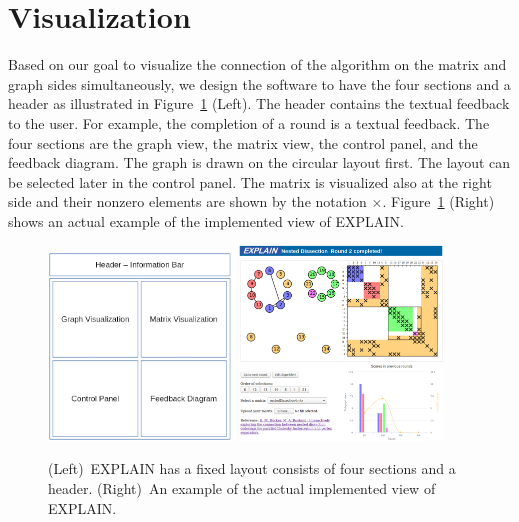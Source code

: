 \documentclass[12pt, twoside,a4paper,toc=bibliography]{scrbook}
\newcommand{\figref}[1]{Figure~\protect\ref{#1}}
\begin{document}
\section{Visualization}
\label{s.vis}
Based on our goal to visualize the connection of the algorithm on the matrix and graph sides simultaneously,
we design the software to have the four sections and a header as illustrated in \figref{explain-design} (Left).
The header contains the textual feedback to the user. For example, the completion of a round
is a textual feedback. The four sections are the graph view, the matrix view, the control panel, and
the feedback diagram.
The graph is drawn on the circular layout first. The layout can be selected later
in the control panel. The matrix is visualized also at the right side and
their nonzero elements are shown by the notation $\times$.
\figref{explain-design} (Right) shows an actual example of the implemented view of
\mbox{EXPLAIN}.

\begin{figure}
\centering
\includegraphics[width=0.44\textwidth]{explain-vis.png}
\hfill
\includegraphics[width=0.48\textwidth]{explain2-init.png}
\caption{
(Left)~\mbox{EXPLAIN} has a fixed layout consists of four sections and a header.
(Right)~An example of the actual implemented view of \mbox{EXPLAIN}.}
\label{explain-design}
\end{figure}
\end{document}

